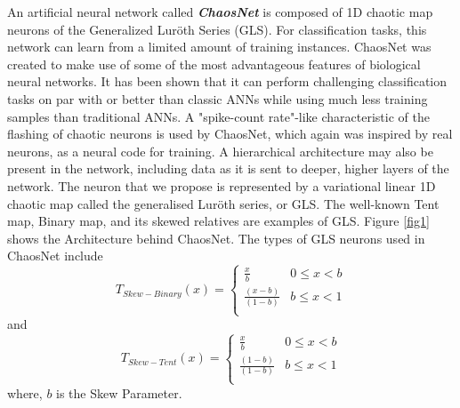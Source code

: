 \documentclass[runningheads]{llncs}
\begin{document}
An artificial neural network called \textit{\textbf{ChaosNet}} is composed of 1D chaotic map neurons of the Generalized Luröth Series (GLS). For classification tasks, this network can learn from a limited amount of training instances. ChaosNet was created to make use of some of the most advantageous features of biological neural networks. It has been shown that it can perform challenging classification tasks on par with or better than classic ANNs while using much less training samples than traditional ANNs. A "spike-count rate"-like characteristic of the flashing of chaotic neurons is used by ChaosNet, which again was inspired by real neurons, as a neural code for training. A hierarchical architecture may also be present in the network, including data as it is sent to deeper, higher layers of the network. The neuron that we propose is represented by a variational linear 1D chaotic map called the generalised Luröth series, or GLS. The well-known Tent map, Binary map, and its skewed relatives are examples of GLS. Figure \ref{fig1} shows the Architecture behind ChaosNet. The types of GLS neurons used in ChaosNet include 
\begin{equation}
T_{Skew-Binary}(x)=\left\{\begin{matrix}\frac{x}{b}&0\le x<b\\\frac{\left(x-b\right)}{\left(1-b\right)}&b\le x<1\\\end{matrix}\right.
\end{equation}
and
\begin{equation}
T_{Skew-Tent}(x)=\left\{\begin{matrix}\frac{x}{b}&0\le x<b\\\frac{\left(1-b\right)}{\left(1-b\right)}&b\le x<1\\\end{matrix}\right.
\end{equation}
where, $b$ is the Skew Parameter.
\end{document}
